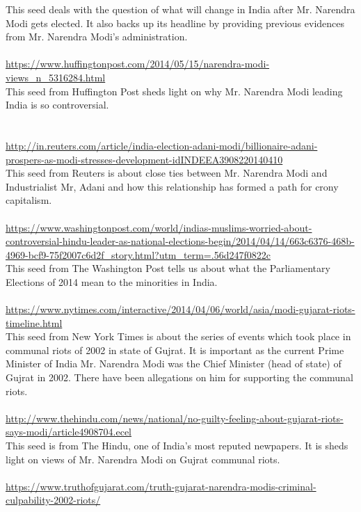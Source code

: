 \documentclass[11pt,journal,compsoc,onecolumn]{IEEEtran}
\begin{document}
This seed deals with the question of what will change in India after Mr. Narendra Modi gets elected. It also backs up its headline by providing previous evidences from Mr. Narendra Modi's administration.\\
\\
\url{https://www.huffingtonpost.com/2014/05/15/narendra-modi-views_n_5316284.html}\\
This seed from Huffington Post sheds light on why Mr. Narendra Modi leading India is so controversial.\\
\\
\\
\url{http://in.reuters.com/article/india-election-adani-modi/billionaire-adani-prospers-as-modi-stresses-development-idINDEEA3908220140410}\\
This seed from Reuters is about close ties between Mr. Narendra Modi and Industrialist Mr, Adani and how this relationship has formed a path for crony capitalism.\\
\\
\url{https://www.washingtonpost.com/world/indias-muslims-worried-about-controversial-hindu-leader-as-national-elections-begin/2014/04/14/663c6376-468b-4969-bcf9-75f2007c6d2f_story.html?utm_term=.56d247f0822c}\\
This seed from The Washington Post tells us about what the Parliamentary Elections of 2014 mean to the minorities in India.\\
\\
\url{https://www.nytimes.com/interactive/2014/04/06/world/asia/modi-gujarat-riots-timeline.html}\\
This seed from New York Times is about the series of events which took place in communal riots of 2002 in state of Gujrat. It is important as the current Prime Minister of India Mr. Narendra Modi was the Chief Minister (head of state) of Gujrat in 2002. There have been allegations on him for supporting the communal riots.\\
\\
\url{http://www.thehindu.com/news/national/no-guilty-feeling-about-gujarat-riots-says-modi/article4908704.ecel}\\
This seed is from The Hindu, one of India's most reputed newpapers. It is sheds light on views of Mr. Narendra Modi on Gujrat communal riots.\\
\\
\url{https://www.truthofgujarat.com/truth-gujarat-narendra-modis-criminal-culpability-2002-riots/}\\
\end{document}
